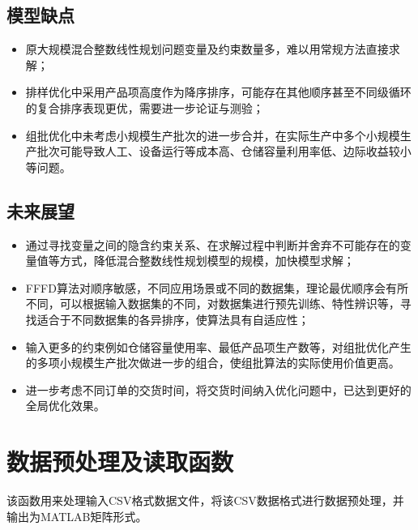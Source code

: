 \documentclass[bwprint]{gmcmthesis}
\begin{document}
\subsection{模型缺点}
\begin{itemize}
    \item 原大规模混合整数线性规划问题变量及约束数量多，难以用常规方法直接求解；
    \item 排样优化中采用产品项高度作为降序排序，可能存在其他顺序甚至不同级循环的复合排序表现更优，需要进一步论证与测验；
    \item 组批优化中未考虑小规模生产批次的进一步合并，在实际生产中多个小规模生产批次可能导致人工、设备运行等成本高、仓储容量利用率低、边际收益较小等问题。
\end{itemize}

\subsection{未来展望}
\begin{itemize}
	\item 通过寻找变量之间的隐含约束关系、在求解过程中判断并舍弃不可能存在的变量值等方式，降低混合整数线性规划模型的规模，加快模型求解；
	\item FFFD算法对顺序敏感，不同应用场景或不同的数据集，理论最优顺序会有所不同，可以根据输入数据集的不同，对数据集进行预先训练、特性辨识等，寻找适合于不同数据集的各异排序，使算法具有自适应性；
	\item 输入更多的约束例如仓储容量使用率、最低产品项生产数等，对组批优化产生的多项小规模生产批次做进一步的组合，使组批算法的实际使用价值更高。
	\item 进一步考虑不同订单的交货时间，将交货时间纳入优化问题中，已达到更好的全局优化效果。
\end{itemize}



\newpage
\quad
\newpage





\cite{FFFD,PAPER3,BOOK3}

\newpage
\appendix
\newpage
\section{数据预处理及读取函数}\label{数据预处理及读取函数}
该函数用来处理输入CSV格式数据文件，将该CSV数据格式进行数据预处理，并输出为MATLAB矩阵形式。
\end{document}
